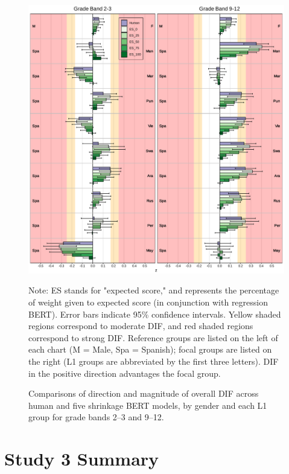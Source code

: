 \documentclass [PhD] {uclathes}
\begin{document}
\begin{figure}[h]
    \centering
    \caption{Comparisons of direction and magnitude of overall DIF across human and five shrinkage BERT models, by gender and each L1 group for grade bands 2–3 and 9–12.}    
    \includegraphics[width=6.5in]{figures/20230425_ETS-DIF_ES_z_ovr_edit.pdf}
    \label{fig:shrinkBERT_z_ovr}
	{\newline Note: ES stands for "expected score," and represents the percentage of weight given to expected score (in conjunction with regression BERT). Error bars indicate 95\% confidence intervals. Yellow shaded regions correspond to moderate DIF, and red shaded regions correspond to strong DIF. Reference groups are listed on the left of each chart (M = Male, Spa = Spanish); focal groups are listed on the right (L1 groups are abbreviated by the first three letters). DIF in the positive direction advantages the focal group. \par}
\end{figure}

\section{Study 3 Summary}
\label{sec:stdy3_sum}
\end{document}
